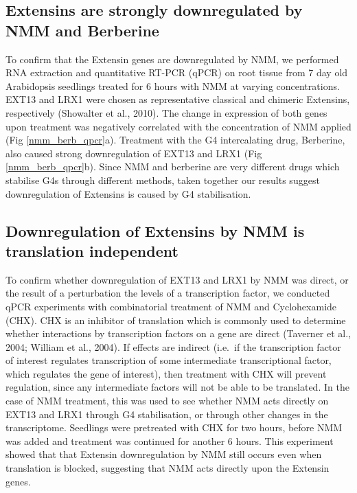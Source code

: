 \documentclass[12pt,a4paper,]{report}
\begin{document}
\newpage

\hypertarget{extensins-are-strongly-downregulated-by-nmm-and-berberine}{%
\subsection{Extensins are strongly downregulated by NMM and
Berberine}\label{extensins-are-strongly-downregulated-by-nmm-and-berberine}}

\label{ssec:extensin_downreg}

To confirm that the Extensin genes are downregulated by NMM, we
performed RNA extraction and quantitative RT-PCR (qPCR) on root tissue
from 7 day old Arabidopsis seedlings treated for 6 hours with NMM at
varying concentrations. EXT13 and LRX1 were chosen as representative
classical and chimeric Extensins, respectively (Showalter et al., 2010).
The change in expression of both genes upon treatment was negatively
correlated with the concentration of NMM applied (Fig
\ref{nmm_berb_qpcr}a). Treatment with the G4 intercalating drug,
Berberine, also caused strong downregulation of EXT13 and LRX1 (Fig
\ref{nmm_berb_qpcr}b). Since NMM and berberine are very different drugs
which stabilise G4s through different methods, taken together our
results suggest downregulation of Extensins is caused by G4
stabilisation.

\hypertarget{downregulation-of-extensins-by-nmm-is-translation-independent}{%
\subsection{Downregulation of Extensins by NMM is translation
independent}\label{downregulation-of-extensins-by-nmm-is-translation-independent}}

\label{sec:extensin_cyclohex}

To confirm whether downregulation of EXT13 and LRX1 by NMM was direct,
or the result of a perturbation the levels of a transcription factor, we
conducted qPCR experiments with combinatorial treatment of NMM and
Cyclohexamide (CHX). CHX is an inhibitor of translation which is
commonly used to determine whether interactions by transcription factors
on a gene are direct (Taverner et al., 2004; William et al., 2004). If
effects are indirect (i.e.~if the transcription factor of interest
regulates transcription of some intermediate transcriptional factor,
which regulates the gene of interest), then treatment with CHX will
prevent regulation, since any intermediate factors will not be able to
be translated. In the case of NMM treatment, this was used to see
whether NMM acts directly on EXT13 and LRX1 through G4 stabilisation, or
through other changes in the transcriptome. Seedlings were pretreated
with CHX for two hours, before NMM was added and treatment was continued
for another 6 hours. This experiment showed that that Extensin
downregulation by NMM still occurs even when translation is blocked,
suggesting that NMM acts directly upon the Extensin genes.
\end{document}
